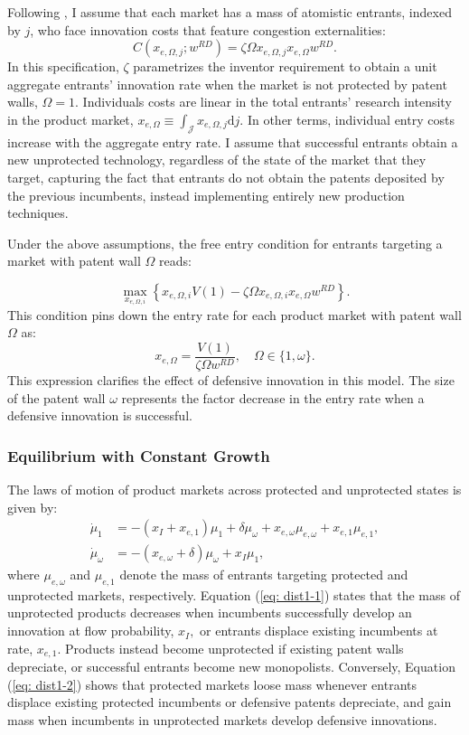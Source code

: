 Following \citeauthor{abramsPatentValueCitations2013}, I assume that
each market has a mass of atomistic entrants, indexed by $j$, who
face innovation costs that feature congestion externalities:
\[
C\left(x_{e,\Omega,j};w^{RD}\right)=\zeta\Omega x_{e,\Omega,j}x_{e,\Omega}w^{RD}.
\]
In this specification, $\zeta$ parametrizes the inventor requirement
to obtain a unit aggregate entrants' innovation rate when the market
is not protected by patent walls, $\Omega=1$. Individuals costs are
linear in the total entrants' research intensity in the product market,
$x_{e,\Omega}\equiv\int_{\mathcal{J}}x_{e,\Omega,j}\mathrm{d}j.$
In other terms, individual entry costs increase with the aggregate
entry rate. I assume that successful entrants obtain a new unprotected
technology, regardless of the state of the market that they target,
capturing the fact that entrants do not obtain the patents deposited
by the previous incumbents, instead implementing entirely new production
techniques. 

Under the above assumptions, the free entry condition for entrants
targeting a market with patent wall $\Omega$ reads:

\[
\max_{x_{e,\Omega,i}}\left\{ x_{e,\Omega,i}V(1)-\zeta\Omega x_{e,\Omega,i}x_{e,\Omega}w^{RD}\right\} .
\]
This condition pins down the entry rate for each product market with
patent wall $\Omega$ as:
\begin{equation}
x_{e,\Omega}=\frac{V(1)}{\zeta\Omega w^{RD}},\quad\Omega\in\{1,\omega\}.\label{eq:RD_e}
\end{equation}
This expression clarifies the effect of defensive innovation in this
model. The size of the patent wall $\omega$ represents the factor
decrease in the entry rate when a defensive innovation is successful. 

\subsubsection{Equilibrium with Constant Growth}

The laws of motion of product markets across protected and unprotected
states is given by:
\begin{align}
\dot{\mu}_{1} & =-\left(x_{I}+x_{e,1}\right)\mu_{1}+\delta\mu_{\omega}+x_{e,\omega}\mu_{e,\omega}+x_{e,1}\mu_{e,1},\label{eq: dist1-1}\\
\dot{\mu}_{\omega} & =-\left(x_{e,\omega}+\delta\right)\mu_{\omega}+x_{I}\mu_{1},\label{eq: dist2-1}
\end{align}
where $\mu_{e,\omega}$ and $\mu_{e,1}$ denote the mass of entrants
targeting protected and unprotected markets, respectively. Equation
(\ref{eq: dist1-1}) states that the mass of unprotected products
decreases when incumbents successfully develop an innovation at flow
probability, $x_{I},$ or entrants displace existing incumbents at
rate, $x_{e,1}$. Products instead become unprotected if existing
patent walls depreciate, or successful entrants become new monopolists.
Conversely, Equation (\ref{eq: dist1-2}) shows that protected markets
loose mass whenever entrants displace existing protected incumbents
or defensive patents depreciate, and gain mass when incumbents in
unprotected markets develop defensive innovations. 

